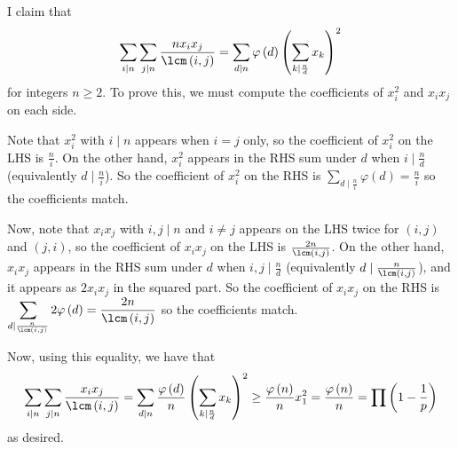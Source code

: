 I claim that \[\displaystyle\sum_{i\mid n}\displaystyle\sum_{j\mid n}\frac{nx_ix_j}{\lcm\left(i,j\right)}=\displaystyle\sum_{d\mid n}\varphi\left(d\right)\left(\displaystyle\sum_{k\mid\frac{n}{d}}x_k\right)^2\] for integers $n\geq2$. To prove this, we must compute the coefficients of $x_i^2$ and $x_ix_j$ on each side.

Note that $x_i^2$ with $i\mid n$ appears when $i=j$ only, so the coefficient of $x_i^2$ on the LHS is $\frac{n}{i}$. On the other hand, $x_i^2$ appears in the RHS sum under $d$ when $i\mid\frac{n}{d}$ (equivalently $d\mid\frac{n}{i}$). So the coefficient of $x_i^2$ on the RHS is $\displaystyle\sum_{d\mid\frac{n}{i}}\varphi\left(d\right)=\frac{n}{i}$ so the coefficients match.

Now, note that $x_ix_j$ with $i,j\mid n$ and $i\neq j$ appears on the LHS twice for $\left(i,j\right)$ and $\left(j,i\right)$, so the coefficient of $x_ix_j$ on the LHS is $\frac{2n}{\lcm\left(i,j\right)}$. On the other hand, $x_ix_j$ appears in the RHS sum under $d$ when $i,j\mid\frac{n}{d}$ (equivalently $d\mid\frac{n}{\lcm\left(i,j\right)}$), and it appears as $2x_ix_j$ in the squared part. So the coefficient of $x_ix_j$ on the RHS is $\displaystyle\sum_{d\mid\frac{n}{\lcm\left(i,j\right)}}2\varphi\left(d\right)=\frac{2n}{\lcm\left(i,j\right)}$ so the coefficients match.

Now, using this equality, we have that \[\displaystyle\sum_{i\mid n}\displaystyle\sum_{j\mid n}\frac{x_ix_j}{\lcm\left(i,j\right)}=\displaystyle\sum_{d\mid n}\frac{\varphi\left(d\right)}{n}\left(\displaystyle\sum_{k\mid\frac{n}{d}}x_k\right)^2\geq\frac{\varphi\left(n\right)}{n}x_1^2=\frac{\varphi\left(n\right)}{n}=\displaystyle\prod\left(1-\frac{1}{p}\right)\] as desired.
